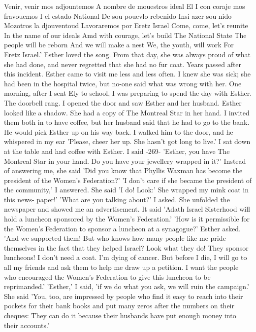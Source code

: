 Venir, venir mos adjountemos 
A nombre de mouestros ideal 
El I con coraje mos fravouemos 
I el estado National 
De sou pouevlo rebenido 
Insi azer sou nido 
Mozotros la djouventoud 
Lavoraremos por Eretz Israel 
Come, come, let's reunite 
In the name of our ideals 
Amd with courage, let's build 
The National State 
The people will be reborn 
And we will make a nest 
We, the youth, will work 
For Eretz Israel.'
Esther loved the song.
From that day, she was always proud of 
what she had done, and never regretted that she had no fur coat.
Years passed after this incident.
Esther came to visit me less 
and less often.
I knew she was sick; she had been in the hospital 
twice, but no-one said what was wrong with her.
One morning, after 
I sent Ely to school, I was preparing to spend the day with Esther.
The doorbell rang.
I opened the door and saw Esther and her husband.
Esther looked like a shadow.
She had a copy of The Montreal Star in 
her hand.
I invited them both in to have coffee, but her husband said that he had to go to the bank.
He would pick Esther up on his 
way back.
I walked him to the door, and he whispered in my ear 
'Please, cheer her up.
She hasn't got long to live.'
I sat down at the table and had coffee with Esther.
I said 
-269- 
'Esther, you have The Montreal Star in your hand.
Do you have 
your jewellery wrapped in it?'
Instead of answering me, she said 'Did you know that Phyllis 
Waxman has become the president of the Women's Federation?'
'I don't care if she became the president of the community,' I 
answered.
She said 'I do!
Look:' She wrapped my mink coat in this news-
paper!'
'What are you talking about?'
I asked.
She unfolded the newspaper and showed me an advertisement.
It said 'Adath Israel Sisterhood will hold a luncheon sponsored by 
the Women's Federation.'
'How is it permissible for the Women's Federation to sponsor a 
luncheon at a synagogue?'
Esther asked.
'And we supported them!
But who knows how many people like me pride themselves in the fact 
that they helped Israel?
Look what they do!
They sponsor luncheons!
I don't need a coat.
I'm dying of cancer.
But before I die, I 
will go to all my friends and ask them to help me draw up a petition.
I want the people who encouraged the Women's Federation to give this 
luncheon to be reprimanded.'
'Esther,' I said, 'if we do what you ask, we will ruin the 
campaign.'
She said 'You, too, are impressed by people who find it easy 
to reach into their pockets for their bank books and put many zeros 
after the numbers on their cheques: They can do it because their 
husbands have put enough money into their accounts.'
